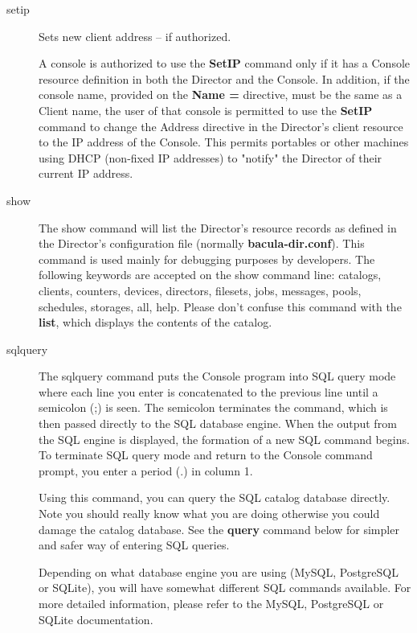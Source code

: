\begin{description}
\item [setip]
   Sets new client address -- if authorized.

   A console is authorized to use the {\bf SetIP} command only if it has a
   Console resource definition in both the Director and the Console.  In
   addition, if the console name, provided on the {\bf Name =} directive,
   must be the same as a Client name, the user of that console is permitted
   to use the {\bf SetIP} command to change the Address directive in the
   Director's client resource to the IP address of the Console.  This
   permits portables or other machines using DHCP (non-fixed IP addresses)
   to "notify" the Director of their current IP address.



\item [show]
   The show command will list the Director's resource records as defined in
   the Director's configuration file (normally {\bf bacula-dir.conf}).
   This command is used mainly for debugging purposes by developers.     
   The following keywords are accepted on the
   show command line: catalogs, clients, counters, devices, directors,
   filesets, jobs, messages, pools, schedules, storages, all, help.
   Please don't confuse this command
   with the {\bf list}, which displays the contents of the catalog.

\item [sqlquery]
   The sqlquery command puts the Console program into SQL query mode where
   each line you enter is concatenated to the previous line until a
   semicolon (;) is seen.  The semicolon terminates the command, which is
   then passed directly to the SQL database engine.  When the output from
   the SQL engine is displayed, the formation of a new SQL command begins.
   To terminate SQL query mode and return to the Console command prompt,
   you enter a period (.) in column 1.

   Using this command, you can query the SQL catalog database directly.
   Note you should really know what you are doing otherwise you could
   damage the catalog database.  See the {\bf query} command below for
   simpler and safer way of entering SQL queries.

   Depending on what database engine you are using (MySQL, PostgreSQL or
   SQLite), you will have somewhat different SQL commands available.  For
   more detailed information, please refer to the MySQL, PostgreSQL or
   SQLite documentation.


\end{description}
